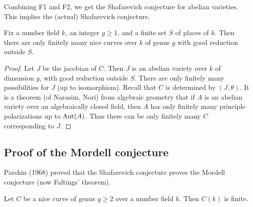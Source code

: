 Combining F1 and F2, we get the Shafarevich conjecture for abelian varieties. 
This implies the (actual) Shafarevich conjecture. 

\begin{conjecture}
Fix a number field $k$, an integer $g\geqslant 1$, and a finite set $S$ of 
places of $k$. Then there are only finitely many nice curves over $k$ of genus 
$g$ with good reduction outside $S$. 
\end{conjecture}
\begin{proof}
Let $J$ be the jacobian of $C$. Then $J$ is an abelian variety over $k$ of 
dimension $g$, with good reduction outside $S$. There are only finitely many 
possibilities for $J$ (up to isomorphism). Recall that $C$ is determined by 
$(J,\theta)$. It is a theorem (of Narasim, Nori) from algebraic geometry that 
if $A$ is an abelian variety over an algebraically closed field, then $A$ has 
only finitely many principle polarizations up to $\operatorname{Aut}(A)$. Thus there can be 
only finitely many $C$ corresponding to $J$. 
\end{proof}





\subsection{Proof of the Mordell conjecture}

Parshin (1968) proved that the Shafarevich conjecture proves the Mordell 
conjecture (now Faltings' theorem). 

\begin{conjecture}[Mordell]
Let $C$ be a nice curve of genus $g\geqslant 2$ over a number field $k$. Then 
$C(k)$ is finite. 
\end{conjecture}


